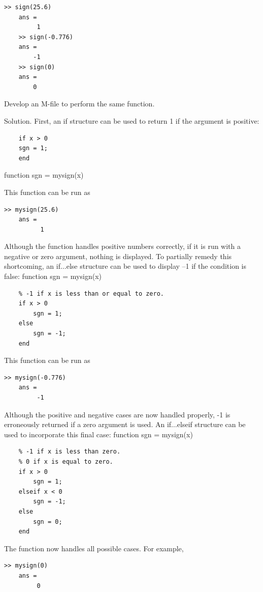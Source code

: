\documentclass[../main.tex]{subfiles}
\begin{document}
\begin{lstlisting}[frame=none, numbers=none]
    >> sign(25.6)
    ans =
         1
    >> sign(-0.776)
    ans =
        -1
    >> sign(0)
    ans =
        0
\end{lstlisting}
Develop an M-file to perform the same function.

Solution. First, an if structure can be used to return 1 if the argument is positive:
\begin{lstlisting}[frame=none, numbers=none]
    % mysign(x) returns 1 if x is greater than zero.
    if x > 0
    sgn = 1;
    end
\end{lstlisting}function sgn = mysign(x)

This function can be run as
\begin{lstlisting}[frame=none, numbers=none]
    >> mysign(25.6)
    ans =
          1
\end{lstlisting}
Although the function handles positive numbers correctly, if it is run with a negative
or zero argument, nothing is displayed. To partially remedy this shortcoming, an
if$\ldots$else structure can be used to display –1 if the condition is false:
function sgn = mysign(x)
\begin{lstlisting}[frame=none, numbers=none]
    % mysign(x) returns 1 if x is greater than zero.
    % -1 if x is less than or equal to zero.
    if x > 0
        sgn = 1;
    else
        sgn = -1;
    end
\end{lstlisting}
    This function can be run as

\begin{lstlisting}[frame=none, numbers=none]
    >> mysign(-0.776)
    ans =
         -1
\end{lstlisting}
Although the positive and negative cases are now handled properly, -1 is erroneously
returned if a zero argument is used. An if$\ldots$elseif structure can be used to incorporate
this final case:
function sgn = mysign(x)
\begin{lstlisting}[frame=none, numbers=none]
    % mysign(x) returns 1 if x is greater than zero.
    % -1 if x is less than zero.
    % 0 if x is equal to zero.
    if x > 0
        sgn = 1;
    elseif x < 0
        sgn = -1;
    else
        sgn = 0;
    end
\end{lstlisting}
    The function now handles all possible cases. For example,

\begin{lstlisting}[frame=none, numbers=none]
    >> mysign(0)
    ans =
         0
\end{lstlisting}
\end{document}
